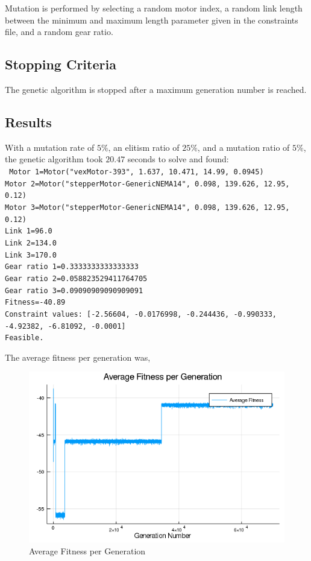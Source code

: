 \documentclass{article}
\begin{document}
Mutation is performed by selecting a random motor index, a random link length
between the minimum and maximum length parameter given in the constraints file,
and a random gear ratio.

\FloatBarrier{}
\subsection{Stopping Criteria}

The genetic algorithm is stopped after a maximum generation number is reached.

\FloatBarrier{}
\subsection{Results}

With a mutation rate of $5\%$, an elitism ratio of $25\%$, and a mutation
ratio of $5\%$, the genetic algorithm took $20.47$ seconds to solve and found: \\
\texttt{
    Motor 1=Motor("vexMotor-393", 1.637, 10.471, 14.99, 0.0945) \\
    Motor 2=Motor("stepperMotor-GenericNEMA14", 0.098, 139.626, 12.95, 0.12) \\
    Motor 3=Motor("stepperMotor-GenericNEMA14", 0.098, 139.626, 12.95, 0.12) \\
    Link 1=96.0 \\
    Link 2=134.0 \\
    Link 3=170.0 \\
    Gear ratio 1=0.3333333333333333 \\
    Gear ratio 2=0.058823529411764705 \\
    Gear ratio 3=0.09090909090909091 \\
    Fitness=-40.89 \\
    Constraint values: [-2.56604, -0.0176998, -0.244436, -0.990333, -4.92382, -6.81092, -0.0001] \\
    Feasible.
}

The average fitness per generation was,
\begin{figure}[h]
    \centering
    \includegraphics[scale=0.6]{average_fitness_per_generation.png}
    \caption{Average Fitness per Generation}
    \label{fig:avg_fitness_per_gen}
\end{figure}
\end{document}
